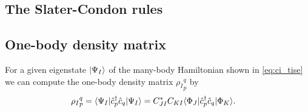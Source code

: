         \subsection{The Slater-Condon rules}

        \subsection{One-body density matrix}
            For a given eigenstate $| \Psi_I \rangle$ of the many-body Hamiltonian
            shown in \autoref{eq:ci_tise} we can compute the one-body density
            matrix ${\rho_I}^{q}_{p}$ by
            \begin{align}
                {\rho_I}^{q}_{p}
                &= \langle \Psi_I |\hat{c}_{p}^{\dagger}\hat{c}_{q}| \Psi_I \rangle
                = C_{JI}^{*}C_{KI}\langle \Phi_J |\hat{c}_{p}^{\dagger}\hat{c}_{q}| \Phi_K \rangle.
            \end{align}

